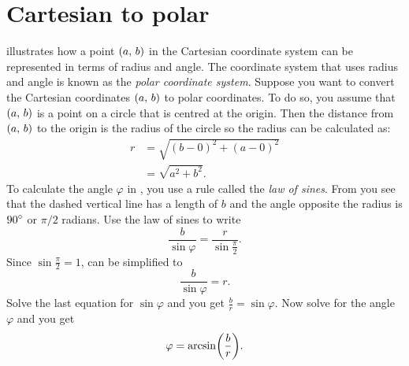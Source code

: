 \documentclass[a4paper,oneside,12pt]{article}
\begin{document}

\section{Cartesian to polar}

 illustrates
how a point $\left\lparen{a},\, {b}\right\rparen$ in the Cartesian coordinate system can be
represented in terms of radius and angle.  The coordinate system that
uses radius and angle is known as the \emph{polar coordinate system}.
Suppose you want to convert the Cartesian coordinates $\left\lparen{a},\, {b}\right\rparen$
to polar coordinates.  To do so, you assume that $\left\lparen{a},\, {b}\right\rparen$ is a
point on a circle that is centred at the origin.  Then the distance
from $\left\lparen{a},\, {b}\right\rparen$ to the origin is the radius of the circle so the
radius can be calculated as:
\begin{align*}
r
&=
\sqrt{
  (b - 0)^2 + (a - 0)^2
} \\[4pt]
&=
\sqrt{
  a^2 + b^2
}.
\end{align*}
To calculate the angle $\varphi$ in
, you use a
rule called the \emph{law of sines}.  From
 you see that
the dashed vertical line has a length of $b$ and the angle opposite
the radius is ${90}^{\circ}$ or $\pi / 2$ radians.  Use the law of
sines to write
\begin{equation}
\label{eqn:law_of_sines}
\frac{b}{\sin \varphi}
=
\frac{r}{\sin \frac{\pi}{2}}.
\end{equation}
Since $\sin \frac{\pi}{2} = 1$,  can be
simplified to
\[
\frac{b}{\sin \varphi}
=
r.
\]
Solve the last equation for $\sin \varphi$ and you get
$\frac{b}{r} = \sin \varphi$.  Now solve for the angle $\varphi$ and
you get
\[
\varphi
=
\arcsin\parenthesis*{\frac{b}{r}}.
\]
\end{document}
